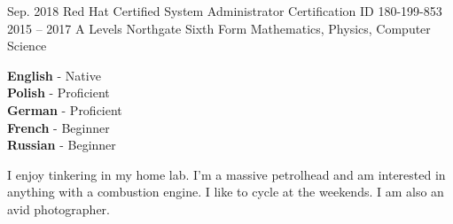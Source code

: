 \documentclass[10pt]{developercv} %
\begin{document}


\begin{entrylist}
	\entry
		{Sep. 2018}
		{Red Hat Certified System Administrator}
		{Certification ID 180-199-853}
    {}
	\entry
		{2015 -- 2017}
		{A Levels}
		{Northgate Sixth Form}
		{Mathematics, Physics, Computer Science}
\end{entrylist}


\begin{minipage}[t]{0.3\textwidth}
	\vspace{-\baselineskip} %

	
	\textbf{English} - Native \\
	\textbf{Polish} - Proficient \\
	\textbf{German} - Proficient \\
  \textbf{French} - Beginner \\
  \textbf{Russian} - Beginner
\end{minipage}
\hfill
\begin{minipage}[t]{0.5\textwidth}
	\vspace{-\baselineskip} %
	
	
	I enjoy tinkering in my home lab. I'm a massive \linebreak petrolhead and am interested in anything with a \linebreak combustion engine. I like to cycle at the weekends. I am also an avid photographer.
\end{minipage}
\hfill
\begin{minipage}[t]{0.5\textwidth}
	\vspace{-\baselineskip} %
\end{minipage}

\end{document}
